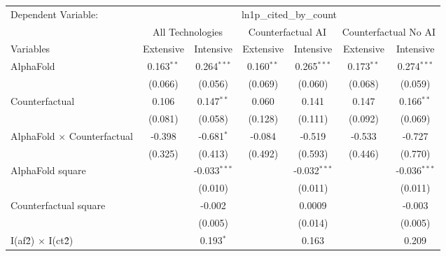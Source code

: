 \begingroup
\centering
\begin{tabular}{lcccccc}
   \tabularnewline \midrule \midrule
   Dependent Variable: & \multicolumn{6}{c}{ln1p\_cited\_by\_count}\\
 & \multicolumn{2}{c}{All Technologies} & \multicolumn{2}{c}{Counterfactual AI} & \multicolumn{2}{c}{Counterfactual No AI} \\
\cmidrule(lr){1-1}\cmidrule(lr){2-3} \cmidrule(lr){4-5} \cmidrule(lr){6-7}
Variables & \multicolumn{1}{c}{Extensive} & \multicolumn{1}{c}{Intensive} & \multicolumn{1}{c}{Extensive} & \multicolumn{1}{c}{Intensive} & \multicolumn{1}{c}{Extensive} & \multicolumn{1}{c}{Intensive} \\
\cmidrule(lr){1-1}\cmidrule(lr){2-2} \cmidrule(lr){3-3} \cmidrule(lr){4-4} \cmidrule(lr){5-5} \cmidrule(lr){6-6} \cmidrule(lr){7-7}
   AlphaFold                          & 0.163$^{**}$ & 0.264$^{***}$  & 0.160$^{**}$ & 0.265$^{***}$  & 0.173$^{**}$ & 0.274$^{***}$\\   
                                      & (0.066)      & (0.056)        & (0.069)      & (0.060)        & (0.068)      & (0.059)\\   
   Counterfactual                     & 0.106        & 0.147$^{**}$   & 0.060        & 0.141          & 0.147        & 0.166$^{**}$\\   
                                      & (0.081)      & (0.058)        & (0.128)      & (0.111)        & (0.092)      & (0.069)\\   
   AlphaFold $\times$ Counterfactual  & -0.398       & -0.681$^{*}$   & -0.084       & -0.519         & -0.533       & -0.727\\   
                                      & (0.325)      & (0.413)        & (0.492)      & (0.593)        & (0.446)      & (0.770)\\   
   AlphaFold square                   &              & -0.033$^{***}$ &              & -0.032$^{***}$ &              & -0.036$^{***}$\\   
                                      &              & (0.010)        &              & (0.011)        &              & (0.011)\\   
   Counterfactual square              &              & -0.002         &              & 0.0009         &              & -0.003\\   
                                      &              & (0.005)        &              & (0.014)        &              & (0.005)\\   
   I(af\^2) $\times$ I(ct\^2)         &              & 0.193$^{*}$    &              & 0.163          &              & 0.209\\   

\end{tabular}
